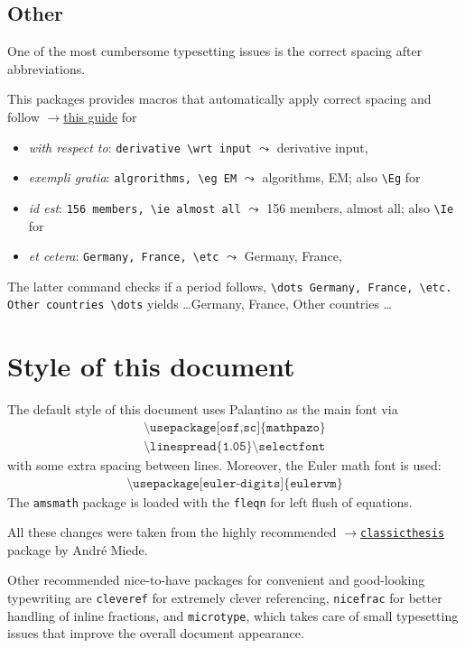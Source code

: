 \documentclass
[
twoside, %
]
{article}
\newcommand{\eq}[1]{\begin{align*}#1\end{align*}}
\begin{document}
\subsection{Other}
One of the most cumbersome typesetting issues is the correct spacing after abbreviations.

This packages provides macros that automatically apply correct spacing and follow \href{http://www.quickanddirtytips.com/education/grammar/ie-versus-eg?page=2}{$\rightarrow$this guide} for 
\begin{itemize}
	\item \emph{with respect to}: \texttt{derivative \textbackslash wrt input} $\leadsto$ derivative \wrt input,
	\item \emph{exempli gratia}: \texttt{algrorithms, \textbackslash eg EM} $\leadsto$ algorithms, \eg EM; also \texttt{\textbackslash Eg} for \Eg
	\item \emph{id est}: \texttt{156 members, \textbackslash ie almost all} $\leadsto$ 156 members, \ie almost all; also \texttt{\textbackslash Ie} for \Ie
	\item \emph{et cetera}: \texttt{Germany, France, \textbackslash etc} $\leadsto$ Germany, France, \etc
\end{itemize}
The latter command checks if a period follows, \ie \texttt{\textbackslash dots Germany, France, \textbackslash etc. Other countries \textbackslash dots} yields \dots Germany, France, \etc Other countries \dots

\section{Style of this document}
The default style of this document uses Palantino as the main font via \eq{\texttt{\textbackslash usepackage[osf,sc]\{mathpazo\}{}}\\\texttt{\textbackslash linespread\{{1.05}\}\textbackslash selectfont}} with some extra spacing between lines. Moreover, the Euler math font is used: \eq{\texttt{\textbackslash usepackage[euler-digits]\{{eulervm}\}}} The \texttt{amsmath} package is loaded with the \texttt{fleqn} for left flush of equations. 

All these changes were taken from the highly recommended \href{https://bitbucket.org/amiede/classicthesis/wiki/Home}{$\rightarrow$\texttt{classicthesis}} package by Andr\'e Miede.

Other recommended nice-to-have packages for convenient and good-looking typewriting are \texttt{cleveref} for extremely clever referencing, \texttt{nicefrac} for better handling of inline fractions, and \texttt{microtype}, which takes care of small typesetting issues that improve the overall document appearance.
\end{document}
